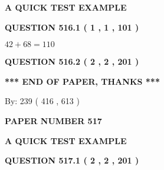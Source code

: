 \documentclass[12pt]{article}
\begin{document}
   
   
   
   
   
 \vspace{0.2in}
{\LARGE {\textbf{ A QUICK TEST EXAMPLE}}}
   
   
  
\vspace{0.2in}
  
{\textbf{\Large{QUESTION
516.1 
 ( 1 , 1 , 101 )
}}}
  
  
 
 

$ %
42 +  %
68=   %
110$
 
 
  
\vspace{0.2in}
  
{\textbf{\Large{QUESTION
516.2 
 ( 2 , 2 , 201 )
}}}
  
  
   
   
 \vspace{0.2in}
 
   
   
   
   
\vspace{1.0in} 
{\textbf{\large{ *** END OF PAPER, THANKS *** }}} 
   
   
\hspace{1.0in} By: 
 239 ( 416 ,  613 )
   
   
   
   
\newpage 
\setcounter{page}{ 
   517001 } 
   
   
   
   
 {\textbf{ \Large{ PAPER NUMBER  517  }}}
   
   
\vspace{0.2in}
   
   
   
   
   
   
 \vspace{0.2in}
{\LARGE {\textbf{ A QUICK TEST EXAMPLE}}}
   
   
  
\vspace{0.2in}
  
{\textbf{\Large{QUESTION
517.1 
 ( 2 , 2 , 201 )
}}}
  
  
  
\vspace{0.2in}
  
\end{document}
